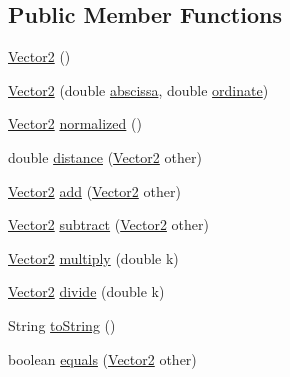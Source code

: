\subsection*{Public Member Functions}
\begin{DoxyCompactItemize}
\item 
\mbox{\hyperlink{class_vector2_ad254b1c618b84ebd5bdc05eefb831647}{Vector2}} ()
\item 
\mbox{\hyperlink{class_vector2_a206a86898973ddf9391e04b4b3287508}{Vector2}} (double \mbox{\hyperlink{class_vector2_aadec5169cf1887537f1c7d60f87e137f}{abscissa}}, double \mbox{\hyperlink{class_vector2_a11433891ace979aadcb1c8c8612c29a3}{ordinate}})
\item 
\mbox{\hyperlink{class_vector2}{Vector2}} \mbox{\hyperlink{class_vector2_ad26f00c8e5cfc76198b1115ce29b51ad}{normalized}} ()
\item 
double \mbox{\hyperlink{class_vector2_a7eb73e809bf6fb6b32c0de8352b707c3}{distance}} (\mbox{\hyperlink{class_vector2}{Vector2}} other)
\item 
\mbox{\hyperlink{class_vector2}{Vector2}} \mbox{\hyperlink{class_vector2_a68ca937db25cb8a4211583a8b9dfdc1a}{add}} (\mbox{\hyperlink{class_vector2}{Vector2}} other)
\item 
\mbox{\hyperlink{class_vector2}{Vector2}} \mbox{\hyperlink{class_vector2_a315ad636760344cbf563e7d71c910c4b}{subtract}} (\mbox{\hyperlink{class_vector2}{Vector2}} other)
\item 
\mbox{\hyperlink{class_vector2}{Vector2}} \mbox{\hyperlink{class_vector2_ac9db5aab07eb87c6b6fcfd22b0257be6}{multiply}} (double k)
\item 
\mbox{\hyperlink{class_vector2}{Vector2}} \mbox{\hyperlink{class_vector2_a57eebd54b29694bb748760f658f129fd}{divide}} (double k)
\item 
String \mbox{\hyperlink{class_vector2_a8c4f6580158ce1d9a70c991de2afca86}{to\+String}} ()
\item 
boolean \mbox{\hyperlink{class_vector2_a2e4b2ed50297b7d7734370395d5f63a5}{equals}} (\mbox{\hyperlink{class_vector2}{Vector2}} other)
\end{DoxyCompactItemize}
